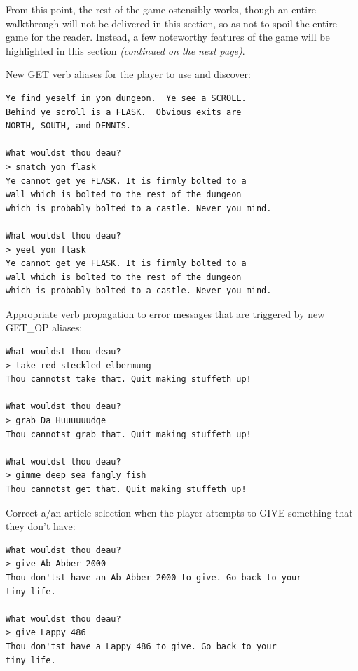 \documentclass[man,12pt]{apa6}
\begin{document}
From this point, the rest of the game ostensibly works, though an entire
walkthrough will not be delivered in this section, so as not to spoil the entire
game for the reader.  Instead, a few noteworthy features of the game will be
highlighted in this section \emph{(continued on the next page)}.

\clearpage
New \textsf{GET} verb aliases for the player to use and discover:

\begin{singlespace}
\begin{framed}
\begin{verbatim}Ye find yeself in yon dungeon.  Ye see a SCROLL.
Behind ye scroll is a FLASK.  Obvious exits are
NORTH, SOUTH, and DENNIS.

What wouldst thou deau?
> snatch yon flask
Ye cannot get ye FLASK. It is firmly bolted to a
wall which is bolted to the rest of the dungeon
which is probably bolted to a castle. Never you mind.

What wouldst thou deau?
> yeet yon flask
Ye cannot get ye FLASK. It is firmly bolted to a
wall which is bolted to the rest of the dungeon
which is probably bolted to a castle. Never you mind.
\end{verbatim}
\end{framed}
\end{singlespace}

Appropriate verb propagation to error messages that are triggered by new
\textsf{GET\_OP} aliases:

\begin{singlespace}
\begin{framed}
\begin{verbatim}What wouldst thou deau?
> take red steckled elbermung
Thou cannotst take that. Quit making stuffeth up!

What wouldst thou deau?
> grab Da Huuuuuudge
Thou cannotst grab that. Quit making stuffeth up!

What wouldst thou deau?
> gimme deep sea fangly fish
Thou cannotst get that. Quit making stuffeth up!
\end{verbatim}
\end{framed}
\end{singlespace}

Correct \textsf{a/an} article selection when the player attempts to
\textsf{GIVE} something that they don't have:

\begin{singlespace}
\begin{framed}
\begin{verbatim}What wouldst thou deau?
> give Ab-Abber 2000
Thou don'tst have an Ab-Abber 2000 to give. Go back to your
tiny life.

What wouldst thou deau?
> give Lappy 486 
Thou don'tst have a Lappy 486 to give. Go back to your
tiny life.
\end{verbatim}
\end{framed}
\end{singlespace}
\end{document}
